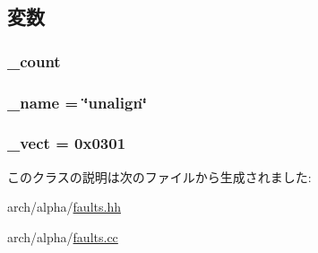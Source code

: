 \subsection{変数}
\hypertarget{classAlphaISA_1_1DtbAlignmentFault_a4bff925c412f331c5aaf6a39b79619ff}{
\subsubsection[{\_\-count}]{ {\bf \_\-count}}}
\label{classAlphaISA_1_1DtbAlignmentFault_a4bff925c412f331c5aaf6a39b79619ff}
\hypertarget{classAlphaISA_1_1DtbAlignmentFault_ac79073ffcd2c66a09bcd3bd3ad206019}{
\subsubsection[{\_\-name}]{ {\bf \_\-name} = \char`\"{}unalign\char`\"{}}}
\label{classAlphaISA_1_1DtbAlignmentFault_ac79073ffcd2c66a09bcd3bd3ad206019}
\hypertarget{classAlphaISA_1_1DtbAlignmentFault_ad9e5855b9db0b2824cf6c507be4a872e}{
\subsubsection[{\_\-vect}]{ {\bf \_\-vect} = 0x0301}}
\label{classAlphaISA_1_1DtbAlignmentFault_ad9e5855b9db0b2824cf6c507be4a872e}


このクラスの説明は次のファイルから生成されました:\begin{DoxyCompactItemize}
\item 
arch/alpha/\hyperlink{arch_2alpha_2faults_8hh}{faults.hh}\item 
arch/alpha/\hyperlink{arch_2alpha_2faults_8cc}{faults.cc}\end{DoxyCompactItemize}
